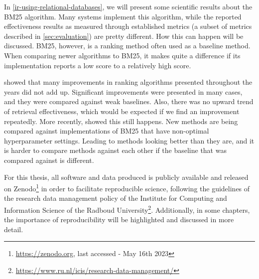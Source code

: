 In \cref{ir-using-relational-databases}, we will present some scientific results about the BM25 algorithm. Many systems implement this algorithm, while the reported effectiveness results as measured through established metrics (a subset of metrics described in \cref{sec:evaluation}) are pretty different. How this can happen will be discussed. BM25, however, is a ranking method often used as a baseline method. When comparing newer algorithms to BM25, it makes quite a difference if its implementation reports a low score to a relatively high score. 

 showed that many improvements in ranking algorithms presented throughout the years did not add up. Significant improvements were presented in many cases, and they were compared against weak baselines. Also, there was no upward trend of retrieval effectiveness, which would be expected if we find an improvement repeatedly. More recently, \citet{weak-baselines} showed this still happens. New methods are being compared against implementations of BM25 that have non-optimal hyperparameter settings. Leading to methods looking better than they are, and it is harder to compare methods against each other if the baseline that was compared against is different.

For this thesis, all software and data produced is publicly available and released on Zenodo\footnote{\url{https://zenodo.org}, last accessed - May 16th 2023} in order to facilitate reproducible science, following the guidelines of the research data management policy of the Institute for Computing and Information Science of the Radboud University\footnote{\url{https://www.ru.nl/icis/research-data-management/}}. Additionally, in some chapters, the importance of reproducibility will be highlighted and discussed in more detail.  